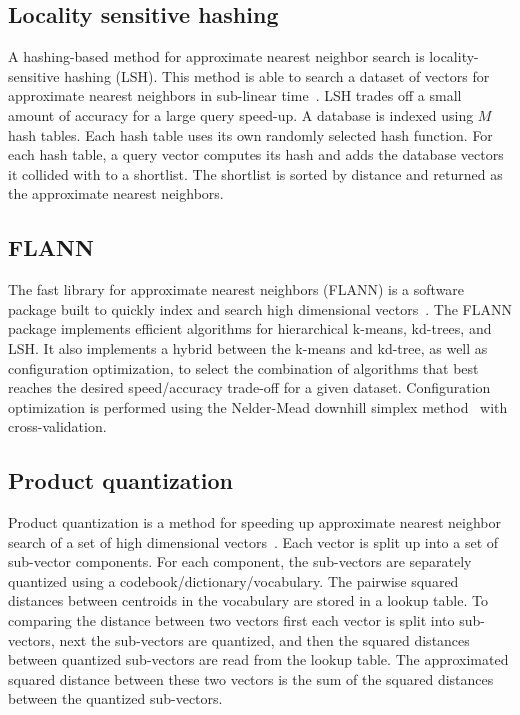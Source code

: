     \subsection{Locality sensitive hashing}
        A hashing-based method for approximate nearest neighbor search is locality-sensitive hashing (LSH). This
        method is able to search a dataset of vectors for approximate nearest neighbors in sub-linear
        time~\cite{charikar_similarity_2002, datar_locality_sensitive_2004, kulis_fast_2009, kulis_kernelized_2012,
        tao_locality_2013}. LSH trades off a small amount of accuracy for a large query speed-up. A database is
        indexed using $M$ hash tables. Each hash table uses its own randomly selected hash function. For each hash
        table, a query vector computes its hash and adds the database vectors it collided with to a shortlist. The
        shortlist is sorted by distance and returned as the approximate nearest neighbors.

    \subsection{FLANN}
        The fast library for approximate nearest neighbors (FLANN) is a software package built to quickly index and
        search high dimensional vectors~\cite{muja_fast_2009}. The FLANN package implements efficient algorithms
        for hierarchical k-means, kd-trees, and LSH{}. It also implements a hybrid between the k-means and kd-tree,
        as well as configuration optimization, to select the combination of algorithms that best reaches the
        desired speed/accuracy trade-off for a given dataset. Configuration optimization is performed using the
        Nelder-Mead downhill simplex method~\cite{nelder_simplex_1965} with cross-validation.

    \subsection{Product quantization}
        Product quantization is a method for speeding up approximate nearest neighbor search of a set of high
        dimensional vectors~\cite{jegou_product_2011,ge_optimized_2013}. Each vector is split up into a set of
        sub-vector components. For each component, the sub-vectors are separately quantized using a
        codebook/dictionary/vocabulary. The pairwise squared distances between centroids in the vocabulary are
        stored in a lookup table. To comparing the distance between two vectors first each vector is split into
        sub-vectors, next the sub-vectors are quantized, and then the squared distances between quantized
        sub-vectors are read from the lookup table. The approximated squared distance between these two vectors is
        the sum of the squared distances between the quantized sub-vectors.


